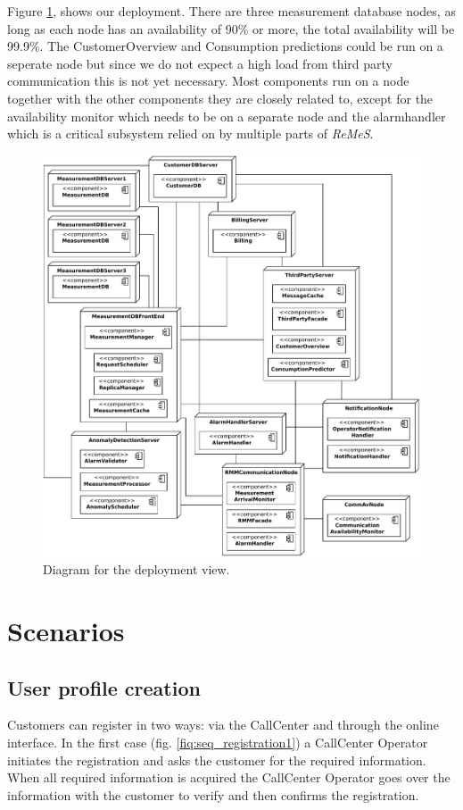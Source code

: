 \documentclass[a4paper,10pt]{article}
\newcommand{\rem}{\emph{ReMeS}\xspace}
\begin{document}
Figure \ref{fig:depl_primary}, shows our deployment.
There are three measurement database nodes, as long as each node has an availability of 90\% or more, the total availability will be 99.9\%. The CustomerOverview and Consumption predictions could be run on a seperate node but since we do not expect a high load from third party communication this is not yet necessary. Most components run on a node together with the other components they are closely related to, except for the availability monitor which needs to be on a separate node and the alarmhandler which is a critical subsystem relied on by multiple parts of \rem.

\begin{figure}[!htp]
    \centering
    \includegraphics[width=\textwidth]{Deployment Diagram}
    \caption{Diagram for the deployment view.}\label{fig:depl_primary}
\end{figure}

\section{Scenarios}\label{sec:scenarios}

\subsection{User profile creation}
Customers can register in two ways: via the CallCenter and through the online interface.
In the first case (fig. \ref{fiq:seq_registration1}) a CallCenter Operator initiates the registration and asks the customer for the required information.
When all required information is acquired the CallCenter Operator goes over the information with the customer to verify and then confirms the registration.
\end{document}
